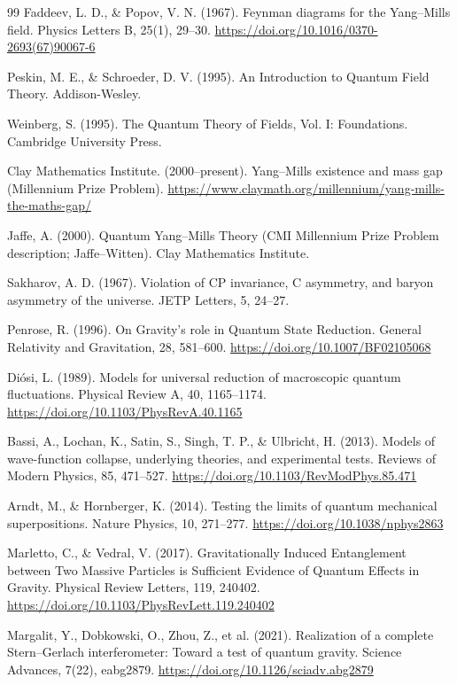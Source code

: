 \begin{thebibliography}{99}
		Faddeev, L. D., \& Popov, V. N. (1967). Feynman diagrams for the Yang–Mills field. Physics Letters B, 25(1), 29–30. \url{https://doi.org/10.1016/0370-2693(67)90067-6}
		
		Peskin, M. E., \& Schroeder, D. V. (1995). An Introduction to Quantum Field Theory. Addison-Wesley.
		
		Weinberg, S. (1995). The Quantum Theory of Fields, Vol. I: Foundations. Cambridge University Press.
		
		Clay Mathematics Institute. (2000–present). Yang–Mills existence and mass gap (Millennium Prize Problem). \url{https://www.claymath.org/millennium/yang-mills-the-maths-gap/}
		
		Jaffe, A. (2000). Quantum Yang–Mills Theory (CMI Millennium Prize Problem description; Jaffe–Witten). Clay Mathematics Institute.
		
		Sakharov, A. D. (1967). Violation of CP invariance, C asymmetry, and baryon asymmetry of the universe. JETP Letters, 5, 24–27.
		
		Penrose, R. (1996). On Gravity’s role in Quantum State Reduction. General Relativity and Gravitation, 28, 581–600. \url{https://doi.org/10.1007/BF02105068}
		
		Diósi, L. (1989). Models for universal reduction of macroscopic quantum fluctuations. Physical Review A, 40, 1165–1174. \url{https://doi.org/10.1103/PhysRevA.40.1165}
		
		Bassi, A., Lochan, K., Satin, S., Singh, T. P., \& Ulbricht, H. (2013). Models of wave-function collapse, underlying theories, and experimental tests. Reviews of Modern Physics, 85, 471–527. \url{https://doi.org/10.1103/RevModPhys.85.471}
		
		Arndt, M., \& Hornberger, K. (2014). Testing the limits of quantum mechanical superpositions. Nature Physics, 10, 271–277. \url{https://doi.org/10.1038/nphys2863}
		
		Marletto, C., \& Vedral, V. (2017). Gravitationally Induced Entanglement between Two Massive Particles is Sufficient Evidence of Quantum Effects in Gravity. Physical Review Letters, 119, 240402. \url{https://doi.org/10.1103/PhysRevLett.119.240402}
		
		Margalit, Y., Dobkowski, O., Zhou, Z., et al. (2021). Realization of a complete Stern–Gerlach interferometer: Toward a test of quantum gravity. Science Advances, 7(22), eabg2879. \url{https://doi.org/10.1126/sciadv.abg2879}
		

\end{thebibliography}
